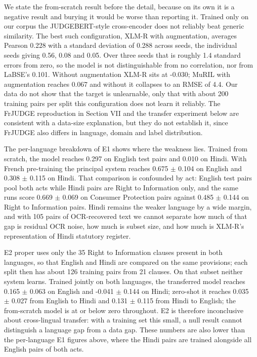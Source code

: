 \documentclass[conference]{IEEEtran}
\begin{document}
We state the from-scratch result before the detail, because on its own it is a negative result and burying it would be worse than reporting it. Trained only on our corpus the JUDGEBERT-style cross-encoder does not reliably beat generic similarity. The best such configuration, XLM-R with augmentation, averages Pearson 0.228 with a standard deviation of 0.288 across seeds, the individual seeds giving 0.56, 0.08 and 0.05. Over three seeds that is roughly 1.4 standard errors from zero, so the model is not distinguishable from no correlation, nor from LaBSE's 0.101. Without augmentation XLM-R sits at -0.030; MuRIL with augmentation reaches 0.067 and without it collapses to an RMSE of 4.4. Our data do not show that the target is unlearnable, only that with about 200 training pairs per split this configuration does not learn it reliably. The FrJUDGE reproduction in Section VII and the transfer experiment below are consistent with a data-size explanation, but they do not establish it, since FrJUDGE also differs in language, domain and label distribution.

The per-language breakdown of E1 shows where the weakness lies. Trained from scratch, the model reaches 0.297 on English test pairs and 0.010 on Hindi. With French pre-training the principal system reaches 0.675 \ensuremath{\pm} 0.104 on English and 0.308 \ensuremath{\pm} 0.115 on Hindi. That comparison is confounded by act: English test pairs pool both acts while Hindi pairs are Right to Information only, and the same runs score 0.669 \ensuremath{\pm} 0.069 on Consumer Protection pairs against 0.485 \ensuremath{\pm} 0.144 on Right to Information pairs. Hindi remains the weaker language by a wide margin, and with 105 pairs of OCR-recovered text we cannot separate how much of that gap is residual OCR noise, how much is subset size, and how much is XLM-R's representation of Hindi statutory register.

E2 proper uses only the 35 Right to Information clauses present in both languages, so that English and Hindi are compared on the same provisions; each split then has about 126 training pairs from 21 clauses. On that subset neither system learns. Trained jointly on both languages, the transferred model reaches 0.165 \ensuremath{\pm} 0.063 on English and -0.041 \ensuremath{\pm} 0.144 on Hindi; zero-shot it reaches 0.035 \ensuremath{\pm} 0.027 from English to Hindi and 0.131 \ensuremath{\pm} 0.115 from Hindi to English; the from-scratch model is at or below zero throughout. E2 is therefore inconclusive about cross-lingual transfer: with a training set this small, a null result cannot distinguish a language gap from a data gap. These numbers are also lower than the per-language E1 figures above, where the Hindi pairs are trained alongside all English pairs of both acts.
\end{document}
